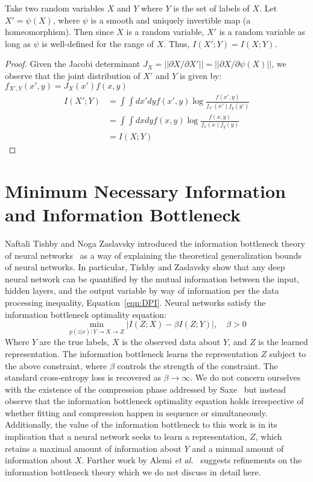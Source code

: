 \begin{theorem}\label{thm:MI invariance}
Take two random variables $X$ and $Y$ where $Y$ is the set of labels of $X$.
Let $X' = \psi(X)$, where $\psi$ is a smooth and uniquely invertible map (a homeomorphism).
Then since $X$ is a random variable, $X'$ is a random variable as long as $\psi$ is well-defined for the range of $X$.
Thus, $I(X'; Y) = I(X; Y)$.
\end{theorem}
\begin{proof}
Given the Jacobi determinant $J_X = ||\partial X/ \partial X'|| = ||\partial X / \partial \psi(X)||$, we observe that the joint distribution of $X'$ and $Y$ is given by: $f_{X', Y}(x', y) = J_X(x')f(x, y)$
\begin{align}
I(X'; Y) & = \int \int dx' dy f(x', y) \log \frac{f(x',y)}{f_{x'}(x')f_{y}(y')} \\
& = \int \int dx dy f(x, y) \log \frac{f(x, y)}{f_{x}(x)f_{y}(y)}\\
& = I(X; Y)
\end{align}
\end{proof}

\section{Minimum Necessary Information and Information Bottleneck}\label{MNI_IB}
Naftali Tishby and Noga Zaslavsky introduced the information bottleneck theory of neural networks~\cite{tishby2015deep} as a way of explaining the theoretical generalization bounds of neural networks.
In particular, Tishby and Zaslavsky show that any deep neural network can be quantified by the mutual information between the input, hidden layers, and the output variable by way of information per the data processing inequality, Equation~\ref{eqn:DPI}.
Neural networks satisfy the information bottleneck optimality equation:
\begin{equation}
\min_{p(z|x):Y \to X \to Z} |I(Z;X) - \beta I(Z; Y)| , \quad\beta > 0	
\end{equation}
Where $Y$ are the true labels, $X$ is the observed data about $Y$, and $Z$ is the learned representation. 
The information bottleneck learns the representation $Z$ subject to the above constraint, where $\beta$ controls the strength of the constraint.
The standard cross-entropy loss is recovered as $\beta \to \infty$. 
We do not concern ourselves with the existence of the compression phase addressed by Saxe~\cite{saxe2019information} but instead observe that the information bottleneck optimality equation holds irrespective of whether fitting and compression happen in sequence or simultaneously.
Additionally, the value of the information bottleneck to this work is in its implication that a neural network seeks to learn a representation, $Z$, which retains a maximal amount of information about $Y$ and a minmal amount of information about $X$.
Further work by Alemi \textit{et al.}~\cite{alemi2016deep} suggests refinements on the information bottleneck theory which we do not discuss in detail here. 

